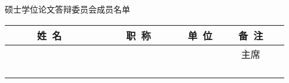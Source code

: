 \newpage
\thispagestyle{empty}
\vspace*{2em}

\begin{center}\STSong{}
 \underline{\makebox[4em][c]{\ccauthor}} 硕士学位论文答辩委员会成员名单
\end{center}

\begin{center}
\renewcommand{\arraystretch}{1.4}
\begin{tabular}{|c|c|c|c|} \hline
~~~~~姓~名~~~~~ & ~~~~~职~称~~~~~ & \hspace{6em}单~位\hspace{6em} & ~~~备~注~~~\\
\hline
  &       &     & 主席  \\ \hline
  &       &     &       \\ \hline
  &       &     &       \\ \hline
  &       &     &       \\ \hline
  &       &     &       \\ \hline
\end{tabular}
\end{center}
